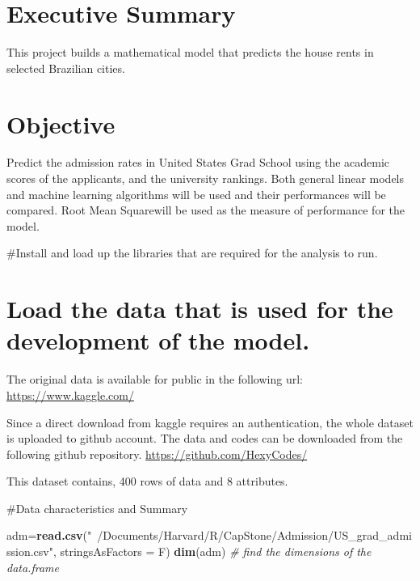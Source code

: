 \documentclass[11pt,]{article}
\newenvironment{Shaded}{\begin{snugshade}}{\end{snugshade}}
\newcommand{\CommentTok}[1]{\textcolor[rgb]{0.56,0.35,0.01}{\textit{#1}}}
\newcommand{\DataTypeTok}[1]{\textcolor[rgb]{0.13,0.29,0.53}{#1}}
\newcommand{\KeywordTok}[1]{\textcolor[rgb]{0.13,0.29,0.53}{\textbf{#1}}}
\newcommand{\NormalTok}[1]{#1}
\newcommand{\StringTok}[1]{\textcolor[rgb]{0.31,0.60,0.02}{#1}}
\begin{document}
\vskip -8.5pt

{
\hypersetup{linkcolor=black}
\setcounter{tocdepth}{2}
\tableofcontents
}


\noindent  

\hypertarget{executive-summary}{%
\section{Executive Summary}\label{executive-summary}}

This project builds a mathematical model that predicts the house rents
in selected Brazilian cities.

\hypertarget{objective}{%
\section{Objective}\label{objective}}

Predict the admission rates in United States Grad School using the
academic scores of the applicants, and the university rankings. Both
general linear models and machine learning algorithms will be used and
their performances will be compared. Root Mean Squarewill be used as the
measure of performance for the model.

\#Install and load up the libraries that are required for the analysis
to run.

\hypertarget{load-the-data-that-is-used-for-the-development-of-the-model.}{%
\section{Load the data that is used for the development of the
model.}\label{load-the-data-that-is-used-for-the-development-of-the-model.}}

The original data is available for public in the following url:
\url{https://www.kaggle.com/}

Since a direct download from kaggle requires an authentication, the
whole dataset is uploaded to github account. The data and codes can be
downloaded from the following github repository.
\url{https://github.com/HexyCodes/}

This dataset contains, 400 rows of data and 8 attributes.

\#Data characteristics and Summary

\begin{Shaded}
\begin{Highlighting}[]
\NormalTok{adm=}\KeywordTok{read.csv}\NormalTok{(}\StringTok{"~/Documents/Harvard/R/CapStone/Admission/US_grad_admission.csv"}\NormalTok{, }
             \DataTypeTok{stringsAsFactors =}\NormalTok{ F)}
\KeywordTok{dim}\NormalTok{(adm) }\CommentTok{# find the dimensions of the data.frame}
\end{Highlighting}
\end{Shaded}
\end{document}
